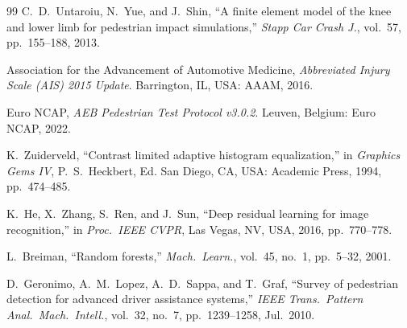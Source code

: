 \documentclass[journal]{IEEEtran}
\begin{document}
\begin{thebibliography}{99}
C.~D.~Untaroiu, N.~Yue, and J.~Shin,
``A finite element model of the knee and lower limb for pedestrian
impact simulations,''
\textit{Stapp Car Crash J.}, vol.~57, pp.~155--188, 2013.

Association for the Advancement of Automotive Medicine,
\textit{Abbreviated Injury Scale (AIS) 2015 Update}.
Barrington, IL, USA: AAAM, 2016.

Euro NCAP, \textit{AEB Pedestrian Test Protocol v3.0.2}.
Leuven, Belgium: Euro NCAP, 2022.

K.~Zuiderveld,
``Contrast limited adaptive histogram equalization,''
in \textit{Graphics Gems IV}, P.~S.~Heckbert, Ed.
San Diego, CA, USA: Academic Press, 1994, pp.~474--485.

K.~He, X.~Zhang, S.~Ren, and J.~Sun,
``Deep residual learning for image recognition,''
in \textit{Proc.\ IEEE CVPR}, Las Vegas, NV, USA, 2016, pp.~770--778.

L.~Breiman,
``Random forests,''
\textit{Mach.\ Learn.}, vol.~45, no.~1, pp.~5--32, 2001.

D.~Geronimo, A.~M.~Lopez, A.~D.~Sappa, and T.~Graf,
``Survey of pedestrian detection for advanced driver assistance
systems,''
\textit{IEEE Trans.\ Pattern Anal.\ Mach.\ Intell.}, vol.~32, no.~7,
pp.~1239--1258, Jul.~2010.

\end{thebibliography}
\end{document}
